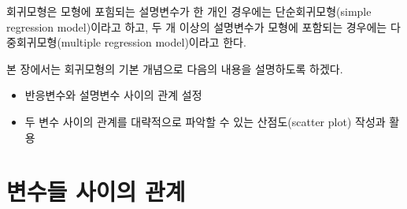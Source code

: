 \documentclass[
]{book}
\begin{document}
회귀모형은 모형에 포힘되는 설명변수가 한 개인 경우에는 단순회귀모형(simple regression model)이라고 하고, 두 개 이상의 설명변수가 모형에 포함되는 경우에는 다중회귀모형(multiple regression model)이라고 한다.

본 장에서는 회귀모형의 기본 개념으로 다음의 내용을 설명하도록 하겠다.

\begin{itemize}
\item
  반응변수와 설명변수 사이의 관계 설정
\item
  두 변수 사이의 관계를 대략적으로 파악할 수 있는 산점도(scatter plot) 작성과 활용
\end{itemize}

\hypertarget{uxbcc0uxc218uxb4e4-uxc0acuxc774uxc758-uxad00uxacc4}{%
\section{변수들 사이의 관계}\label{uxbcc0uxc218uxb4e4-uxc0acuxc774uxc758-uxad00uxacc4}}

  
\end{document}
